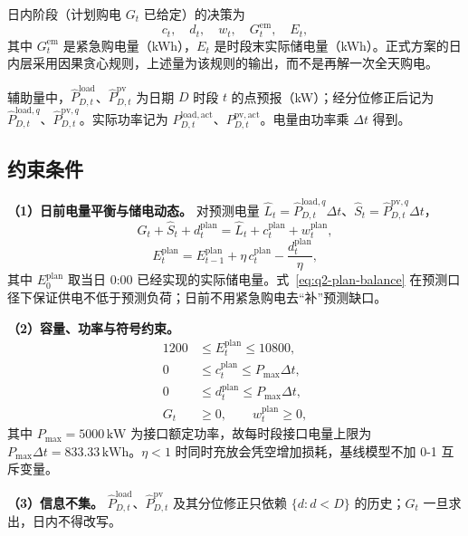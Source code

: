 日内阶段（计划购电 \(G_t\) 已给定）的决策为
\[
c_t,\quad
d_t,\quad
w_t,\quad
G_t^{\mathrm{em}},\quad
E_t,
\]
其中 \(G_t^{\mathrm{em}}\) 是紧急购电量（kWh），\(E_t\) 是时段末实际储电量（kWh）。正式方案的日内层采用因果贪心规则，上述量为该规则的输出，而不是再解一次全天购电。

辅助量中，\(\hat{P}_{D,t}^{\mathrm{load}}\)、\(\hat{P}_{D,t}^{\mathrm{pv}}\) 为日期 \(D\) 时段 \(t\) 的点预报（kW）；经分位修正后记为 \(\hat{P}_{D,t}^{\mathrm{load},q}\)、\(\hat{P}_{D,t}^{\mathrm{pv},q}\)。实际功率记为 \(P_{D,t}^{\mathrm{load,act}}\)、\(P_{D,t}^{\mathrm{pv,act}}\)。电量由功率乘 \(\Delta t\) 得到。

\subsection{约束条件}

\noindent\textbf{（1）日前电量平衡与储电动态。}
对预测电量 \(\hat{L}_t=\hat{P}_{D,t}^{\mathrm{load},q}\Delta t\)、\(\hat{S}_t=\hat{P}_{D,t}^{\mathrm{pv},q}\Delta t\)，
\begin{equation}
\label{eq:q2-plan-balance}
G_t+\hat{S}_t+d_t^{\mathrm{plan}}
=\hat{L}_t+c_t^{\mathrm{plan}}+w_t^{\mathrm{plan}},
\end{equation}
\begin{equation}
\label{eq:q2-plan-soc}
E_t^{\mathrm{plan}}
=E_{t-1}^{\mathrm{plan}}
+\eta\,c_t^{\mathrm{plan}}
-\frac{d_t^{\mathrm{plan}}}{\eta},
\end{equation}
其中 \(E_0^{\mathrm{plan}}\) 取当日 0:00 已经实现的实际储电量。式~\eqref{eq:q2-plan-balance} 在预测口径下保证供电不低于预测负荷；日前不用紧急购电去“补”预测缺口。

\noindent\textbf{（2）容量、功率与符号约束。}
\begin{equation}
\label{eq:q2-bounds}
\begin{aligned}
1200&\le E_t^{\mathrm{plan}}\le 10800,\\
0&\le c_t^{\mathrm{plan}}\le P_{\max}\Delta t,\\
0&\le d_t^{\mathrm{plan}}\le P_{\max}\Delta t,\\
G_t&\ge 0,\qquad w_t^{\mathrm{plan}}\ge 0,
\end{aligned}
\end{equation}
其中 \(P_{\max}=5000\,\mathrm{kW}\) 为接口额定功率，故每时段接口电量上限为 \(P_{\max}\Delta t=833.33\,\mathrm{kWh}\)。\(\eta<1\) 时同时充放会凭空增加损耗，基线模型不加 0-1 互斥变量。

\noindent\textbf{（3）信息不集。}
\(\hat{P}_{D,t}^{\mathrm{load}}\)、\(\hat{P}_{D,t}^{\mathrm{pv}}\) 及其分位修正只依赖 \(\{d:d<D\}\) 的历史；\(G_t\) 一旦求出，日内不得改写。

